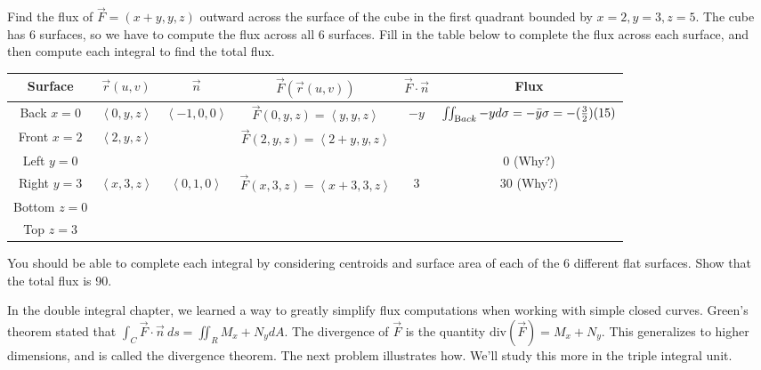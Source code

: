 \begin{problem} 

Find the flux of $ \vec F=(x+y,y,z) $ outward across the surface of the cube in the first quadrant bounded by {$ x=2,y=3,z=5 $}. The cube has 6 surfaces, so we have to compute the flux across all 6 surfaces. Fill in the table below to complete the flux across each surface, and then compute each integral to find the total flux. 
\begin{center}
\begin{tabular}{|c|c|c|c|c|c|}
\hline
Surface&$\vec r(u,v)$ & $\vec n$ & $\vec F(\vec r(u,v))$ & $\vec F\cdot \vec n$  & Flux\\\hline
Back $x=0$&$ \left<0,y,z\right>$   & $ \left<-1,0,0\right>$ & $\vec F(0,y,z) = \left<y,y,z\right>$ & $-y$&  $\iint_{\text Back} -y d\sigma = -\bar y \sigma=-(\frac{3}{2})(15)$\\\hline
Front $x=2$& $ \left<2,y,z\right>$ &  & $\vec F(2,y,z) = \left<2+y,y,z\right>$ &  & \\\hline
Left $y=0$&     & &  & &  $0$ (Why?)\\\hline
Right $y=3$&   $ \left<x,3,z\right>$      & $ \left<0,1,0\right>$  & $\vec F(x,3,z) = \left<x+3,3,z\right>$ & 3 & 30 (Why?) \\\hline
Bottom $z=0$&     & &  & & \\\hline
Top $z=3$&    & &  & & \\\hline
\end{tabular} 
\end{center}
You should be able to complete each integral by considering centroids and surface area of each of the 6 different flat surfaces. Show that the total flux is 90. 
\end{problem}

In the double integral chapter, we learned a way to greatly simplify flux computations when working with simple closed curves.  Green's theorem stated that $\int_C \vec F\cdot \vec n\ ds = \iint_R M_x+N_y dA$.  The divergence of $\vec F$ is the quantity $\text{div}(\vec F) = M_x+N_y$.  This generalizes to higher dimensions, and is called the divergence theorem. The next problem illustrates how.  We'll study this more in the triple integral unit.

